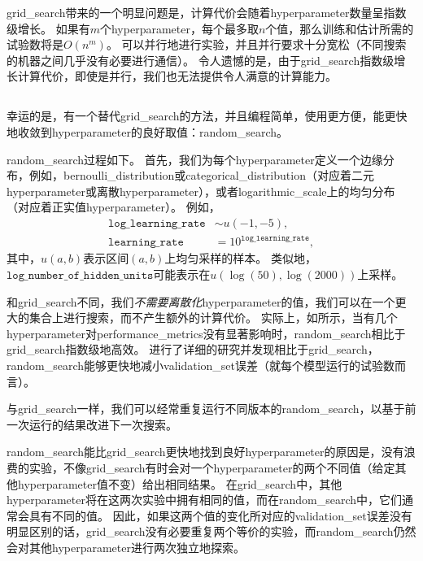 \gls{grid_search}带来的一个明显问题是，计算代价会随着\gls{hyperparameter}数量呈指数级增长。
如果有$m$个\gls{hyperparameter}，每个最多取$n$个值，那么训练和估计所需的试验数将是$O(n^m)$。
可以并行地进行实验，并且并行要求十分宽松（不同搜索的机器之间几乎没有必要进行通信）。
令人遗憾的是，由于\gls{grid_search}指数级增长计算代价，即使是并行，我们也无法提供令人满意的计算能力。


\subsection{}
\label{sec:random_search}
幸运的是，有一个替代\gls{grid_search}的方法，并且编程简单，使用更方便，能更快地收敛到\gls{hyperparameter}的良好取值：\gls{random_search}\citep{Bergstra+Bengio-2012-small}。


\gls{random_search}过程如下。
首先，我们为每个\gls{hyperparameter}定义一个边缘分布，例如，\gls{bernoulli_distribution}或\gls{categorical_distribution}（对应着二元\gls{hyperparameter}或离散\gls{hyperparameter}），或者\gls{logarithmic_scale}上的均匀分布（对应着正实值\gls{hyperparameter}）。
例如，
\begin{align}
	\texttt{log\_learning\_rate} &\sim u(-1, -5), \\
	\texttt{learning\_rate} &= 10^{\texttt{log\_learning\_rate}},
\end{align}
其中，$u(a,b)$表示区间$(a,b)$上均匀采样的样本。
类似地，$\texttt{log\_number\_of\_hidden\_units}$可能表示在$u(\log(50), \log(2000))$上采样。


和\gls{grid_search}不同，我们\emph{不需要离散化}\gls{hyperparameter}的值，我们可以在一个更大的集合上进行搜索，而不产生额外的计算代价。%
实际上，如所示，当有几个\gls{hyperparameter}对\gls{performance_metrics}没有显著影响时，\gls{random_search}相比于\gls{grid_search}指数级地高效。
\cite{Bergstra+Bengio-2012-small}进行了详细的研究并发现相比于\gls{grid_search}， \gls{random_search}能够更快地减小\gls{validation_set}误差（就每个模型运行的试验数而言）。

与\gls{grid_search}一样，我们可以经常重复运行不同版本的\gls{random_search}，以基于前一次运行的结果改进下一次搜索。


\gls{random_search}能比\gls{grid_search}更快地找到良好\gls{hyperparameter}的原因是，没有浪费的实验，不像\gls{grid_search}有时会对一个\gls{hyperparameter}的两个不同值（给定其他\gls{hyperparameter}值不变）给出相同结果。
在\gls{grid_search}中，其他\gls{hyperparameter}将在这两次实验中拥有相同的值，而在\gls{random_search}中，它们通常会具有不同的值。
因此，如果这两个值的变化所对应的\gls{validation_set}误差没有明显区别的话，\gls{grid_search}没有必要重复两个等价的实验，而\gls{random_search}仍然会对其他\gls{hyperparameter}进行两次独立地探索。

